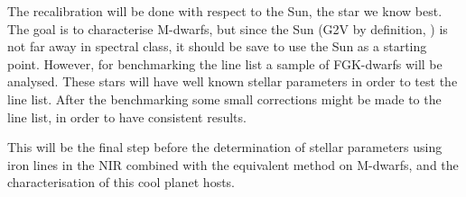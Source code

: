 \documentclass{aa}
\begin{document}
The recalibration will be done with respect to the Sun, the star we know best.
The goal is to characterise M-dwarfs, but since the Sun (G2V by definition,
\citet{Gray2006}) is not far away in spectral class, it should be save to use
the Sun as a starting point. However, for benchmarking the line list a sample
of FGK-dwarfs will be analysed. These stars will have well known stellar
parameters in order to test the line list. After the benchmarking some small
corrections might be made to the line list, in order to have consistent
results.

This will be the final step before the determination of stellar parameters
using iron lines in the NIR combined with the equivalent method on M-dwarfs,
and the characterisation of this cool planet hosts.


\newpage


\nocite*{}
\end{document}
